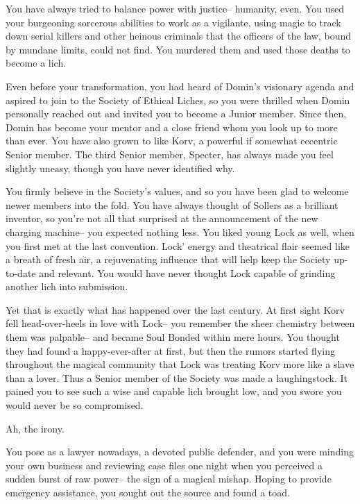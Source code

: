 \documentclass[char]{Sel}
\begin{document}
\name{\cTyran{}}
You have always tried to balance power with justice-- humanity, even. You used your burgeoning sorcerous abilities to work as a vigilante, using magic to track down serial killers and other heinous criminals that the officers of the law, bound by mundane limits, could not find. You murdered them and used those deaths to become a lich.

Even before your transformation, you had heard of Domin’s visionary agenda and aspired to join to the Society of Ethical Liches, so you were thrilled when Domin personally reached out and invited you to become a Junior member. Since then, Domin has become your mentor and a close friend whom you look up to more than ever. You have also grown to like Korv, a powerful if somewhat eccentric Senior member. The third Senior member, Specter, has always made you feel slightly uneasy, though you have never identified why.

You firmly believe in the Society's values, and so you have been glad to welcome newer members into the fold. You have always thought of Sollers as a brilliant inventor, so you're not all that surprised at the announcement of the new charging machine-- you expected nothing less. You liked young Lock as well, when you first met at the last convention. Lock' energy and theatrical flair seemed like a breath of fresh air, a rejuvenating influence that will help keep the Society up-to-date and relevant. You would have never thought Lock capable of grinding another lich into submission.

Yet that is exactly what has happened over the last century. At first sight Korv fell head-over-heels in love with Lock-- you remember the sheer chemistry between them was palpable-- and became Soul Bonded within mere hours. You thought they had found a happy-ever-after at first, but then the rumors started flying throughout the magical community that Lock was treating Korv more like a slave than a lover. Thus a Senior member of the Society was made a laughingstock. It pained you to see such a wise and capable lich brought low, and you swore you would never be so compromised.

Ah, the irony.

You pose as a lawyer nowadays, a devoted public defender, and you were minding your own business and reviewing case files one night when you perceived a sudden burst of raw power-- the sign of a magical mishap. Hoping to provide emergency assistance, you sought out the source and found a toad. 
\end{document}
